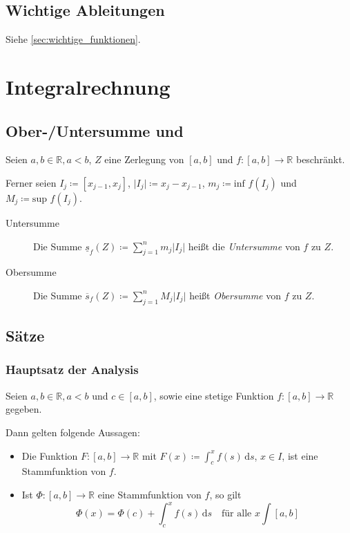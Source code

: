 \documentclass[a4paper, 11pt, accentcolor = tud3b]{tudreport}
\begin{document}
        \section{Wichtige Ableitungen}
            Siehe \ref{sec:wichtige_funktionen}.

    \chapter{Integralrechnung}
        \section{Ober-/Untersumme und}
            Seien $ a, b \in \mathbb{R}, a < b $, $ Z $ eine Zerlegung von $ [a, b] $ und $ f : [a, b] \rightarrow \mathbb{R} $ beschränkt.

            Ferner seien $ I _ j \coloneqq [x _ { j - 1 }, x _ j] $, $ \lvert I _ j \rvert \coloneqq x _ j - x _ { j - 1 } $, $ m _ j \coloneqq \text{inf } f(I _ j) $ und $ M _ j \coloneqq \text{sup } f(I _ j) $.

            \begin{description}
                \item[Untersumme] Die Summe $ \underline{s} _ f (Z) \coloneqq \sum _ { j = 1 } ^ n m _ j \lvert I _ j \rvert $ heißt die \textit{Untersumme} von $ f $ zu $ Z $.
                \item[Obersumme] Die Summe $ \overline{s} _ f (Z) \coloneqq \sum _ { j = 1 } ^ n M _ j \lvert I _ j \rvert $ heißt \textit{Obersumme} von $ f $ zu $ Z $.
            \end{description}

        \section{Sätze}
            \subsection{Hauptsatz der Analysis}
                Seien $ a, b \in \mathbb{R}, a < b $ und $ c \in [a, b] $, sowie eine stetige Funktion $ f : [a, b] \rightarrow \mathbb{R} $ gegeben.

                Dann gelten folgende Aussagen:
                \begin{itemize}
                    \item Die Funktion $ F : [a, b] \rightarrow \mathbb{R} $ mit $ F(x) \coloneqq \int _ c ^ x \! f(s) \, \mathrm{d}s $, $ x \in I $, ist eine Stammfunktion von $ f $.
                    \item Ist $ \Phi : [a, b] \rightarrow \mathbb{R} $ eine Stammfunktion von $ f $, so gilt \[ \Phi(x) = \Phi(c) + \int _ c ^ x \! f(s) \, \mathrm{d}s \quad\text{für alle } x \int [a, b] \]
                \end{itemize}
\end{document}
